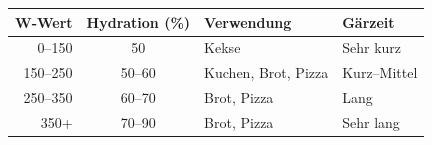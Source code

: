 \begin{tabular}{@{}rcll@{}}
\toprule
\textbf{W-Wert} & \textbf{Hydration (\%)} & \textbf{Verwendung} & \textbf{Gärzeit} \\ \midrule
0--150          & 50     & Kekse             & Sehr kurz    \\
150--250        & 50--60 & Kuchen, Brot, Pizza & Kurz--Mittel \\
250--350        & 60--70 & Brot, Pizza        & Lang          \\
350+            & 70--90 & Brot, Pizza        & Sehr lang     \\ \bottomrule
\end{tabular}
